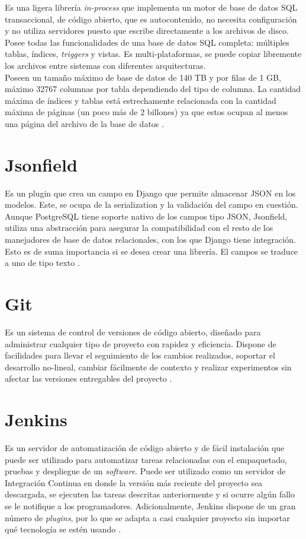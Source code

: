 Es una ligera librería \textit{in-process} que implementa un motor de base de datos SQL transaccional, de código abierto, que es autocontenido, no necesita configuración y no utiliza servidores puesto que escribe directamente a los archivos de disco. Posee todas las funcionalidades de una base de datos SQL completa: múltiples tablas, índices, \textit{triggers} y vistas.  Es multi-plataformas, se puede copiar libremente los archivos entre sistemas con diferentes arquitecturas. \\

Poseen un tamaño máximo de base de datos de 140 TB y por filas de 1 GB,  máximo 32767 columnas por tabla dependiendo del tipo de columna. La cantidad máxima de índices y tablas está estrechamente relacionada con la cantidad máxima de páginas (un poco más de 2 billones) ya que estos ocupan al menos una página del archivo de la base de datos \cite{SQLite}.

\section{Jsonfield}

Es un plugin que crea un campo en Django que permite almacenar JSON en los modelos. Este, se ocupa de la serialization y la validación del campo en cuestión. Aunque PostgreSQL tiene soporte nativo de los campos tipo JSON, Jsonfield, utiliza una abstracción para asegurar la compatibilidad con el resto de los manejadores de base de datos relacionales, con los que Django tiene integración. Esto es de suma importancia si se desea crear una librería. El campos se traduce a uno de tipo texto \cite{jsonfield}.

\section{Git}

Es un sistema de control de versiones de código abierto, diseñado para administrar cualquier tipo de proyecto con rapidez y eficiencia. Dispone de facilidades para llevar el seguimiento de los cambios realizados, soportar el desarrollo no-lineal, cambiar fácilmente de contexto y realizar experimentos sin afectar las versiones entregables del proyecto \cite{Git}.

\section{Jenkins}

Es un servidor de automatización de código abierto y de fácil instalación que puede ser utilizado para automatizar tareas relacionadas con el empaquetado, pruebas y despliegue de un \textit{software}. Puede ser utilizado como un servidor de Integración Continua en donde la versión más reciente del proyecto sea descargada, se ejecuten las tareas descritas anteriormente y si ocurre algún fallo se le notifique a los programadores. Adicionalmente, Jenkins dispone de un gran número de \textit{plugins}, por lo que se adapta a casi cualquier proyecto sin importar qué tecnología se estén usando \cite{Jenkins}.

